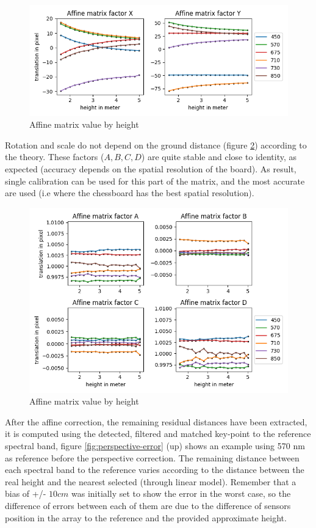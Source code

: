 \documentclass[a4paper,twoside]{article}
\begin{document}
	\begin{figure}[H]
		\centering
		\includegraphics[width=\linewidth]{../figures/affine-translation-height.png}
		\caption{Affine matrix value by height}
		\label{fig:affine-translation-height}
	\end{figure}

	Rotation and scale do not depend on the ground distance (figure \ref{fig:affine-rotation-height}) according to the theory.
	These factors ($A,B,C,D$) are quite stable and close to identity, as expected (accuracy depends on the spatial resolution of the board).
	As result, single calibration can be used for this part of the matrix, and the most accurate are used (i.e where the chessboard has the best spatial resolution).
	
	\begin{figure}[h]
		\centering
		\includegraphics[width=\linewidth]{../figures/affine-rotation-height.png}
		\caption{Affine matrix value by height}
		\label{fig:affine-rotation-height}
	\end{figure}
	
	After the affine correction, the remaining residual distances have been extracted,
	it is computed using the detected, filtered and matched key-point to the reference spectral band,
	figure \ref{fig:perspective-error} (up) %
	shows an example using 570 nm as reference before the perspective correction.
	The remaining distance between each spectral band to the reference varies according to the distance between
	the real height and the nearest selected (through linear model).
	Remember that a bias of +/- $10cm$ was initially set to show the error in the worst case,
	so the difference of errors between each of them are due to the difference of sensors position in the array to the reference and the provided approximate height.
	
\end{document}
